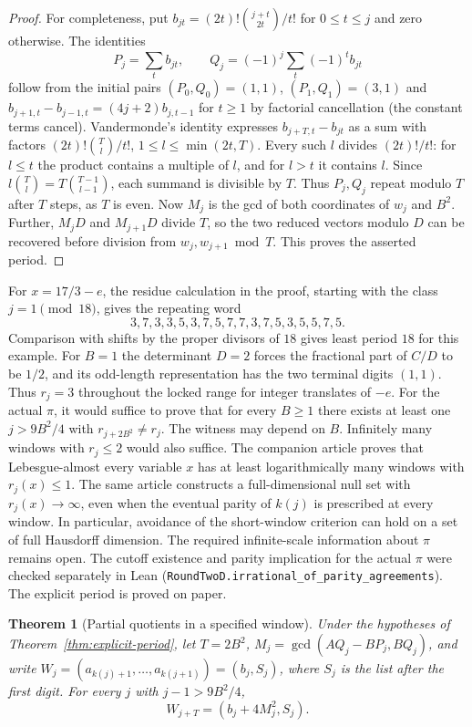\documentclass[11pt]{amsart}
\newtheorem{theorem}{Theorem}[section]
\theoremstyle{definition}
\theoremstyle{remark}
\numberwithin{equation}{section}
\begin{document}
\begin{proof}
For completeness, put $b_{jt}=(2t)!\binom{j+t}{2t}/t!$ for $0\le t\le j$
and zero otherwise. The identities
\[
 P_j=\sum_t b_{jt},\qquad Q_j=(-1)^j\sum_t(-1)^t b_{jt}
\]
follow from the initial pairs $(P_0,Q_0)=(1,1)$, $(P_1,Q_1)=(3,1)$
and $b_{j+1,t}-b_{j-1,t}=(4j+2)b_{j,t-1}$ for $t\ge1$
by factorial cancellation (the constant terms cancel).
Vandermonde's identity expresses $b_{j+T,t}-b_{jt}$ as a sum with factors
$(2t)!\binom{T}{l}/t!$, $1\le l\le\min(2t,T)$.
Every such $l$ divides $(2t)!/t!$: for $l\le t$ the product contains
a multiple of $l$, and for $l>t$ it contains $l$. Since
$l\binom{T}{l}=T\binom{T-1}{l-1}$, each summand is divisible by $T$.
Thus $P_j,Q_j$ repeat modulo $T$ after $T$ steps, as $T$ is even.
Now $M_j$ is the gcd of both coordinates of $w_j$ and $B^2$.
Further, $M_j D$ and $M_{j+1}D$ divide $T$, so the two reduced vectors
modulo $D$ can be recovered before division from $w_j,w_{j+1}\bmod T$.
This proves the asserted period.
\end{proof}
For $x=17/3-e$, the residue calculation in the proof, starting with
the class $j=1\pmod {18}$, gives the repeating word
\[
3,7,3,3,5,3,7,5,7,7,3,7,5,3,5,5,7,5.
\]
Comparison with shifts by the proper divisors of $18$ gives least period
$18$ for this example. For $B=1$ the determinant $D=2$ forces the
fractional part of $C/D$ to be $1/2$, and its odd-length representation
has the two terminal digits $(1,1)$. Thus $r_j=3$ throughout the
locked range for integer translates of $-e$. For the actual $\pi$, it would suffice to prove
that for every $B\ge1$ there exists at least one $j>9B^2/4$ with
$r_{j+2B^2}\ne r_j$. The witness may depend on $B$. Infinitely many windows with $r_j\le2$ would also suffice.
The companion article proves that Lebesgue-almost every variable $x$
has at least logarithmically many windows with $r_j(x)\le1$. The same
article constructs a full-dimensional null set with $r_j(x)\to\infty$,
even when the eventual parity of $k(j)$ is prescribed at every window.
In particular, avoidance of the short-window criterion can hold on a
set of full Hausdorff dimension.
The required infinite-scale information about $\pi$ remains open. The cutoff existence and parity implication for the actual $\pi$ were checked separately in Lean (\texttt{RoundTwoD.irrational\_of\_parity\_agreements}). The explicit period is proved on paper.
\begin{theorem}[Partial quotients in a specified window]\label{thm:digit-shift}
Under the hypotheses of Theorem~\ref{thm:explicit-period}, let
$T=2B^2$, $M_j=\gcd(AQ_j-BP_j,BQ_j)$, and write
$W_j=(a_{k(j)+1},\ldots,a_{k(j+1)})=(b_j,S_j)$, where $S_j$
is the list after the first digit. For every $j$ with $j-1>9B^2/4$,
\[
                W_{j+T}=(b_j+4M_j^2,S_j).
\]
\end{theorem}
\end{document}
